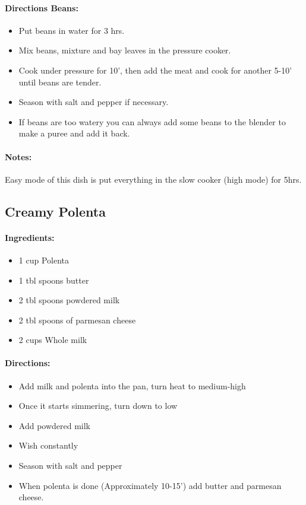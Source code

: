 \documentclass{article}
\begin{document}
\paragraph{Directions Beans:}
\begin{itemize}
	\item Put beans in water for 3 hrs.
	\item Mix beans, mixture and bay leaves in the pressure cooker.
	\item Cook under pressure for 10', then add the meat and cook for another 5-10' until beans are tender.
	\item Season with salt and pepper if necessary.
	\item If beans are too watery you can always add some beans to the blender to make a puree and add it back.
\end{itemize}

\paragraph{Notes:}
Easy mode of this dish is put everything in the slow cooker (high mode) for 5hrs.

\subsection{Creamy Polenta}

\paragraph{Ingredients:}

\begin{itemize}
	\item 1 cup Polenta
	\item 1 tbl spoons butter
	\item 2 tbl spoons powdered milk
	\item 2 tbl spoons of parmesan cheese
	\item 2 cups Whole milk
\end{itemize}

\paragraph{Directions:}
\begin{itemize}
	\item Add milk and polenta into the pan, turn heat to medium-high
	\item Once it starts simmering, turn down to low
	\item Add powdered milk
	\item Wish constantly
	\item Season with salt and pepper
	\item When polenta is done (Approximately 10-15’) add butter and parmesan cheese.
\end{itemize}
\end{document}
